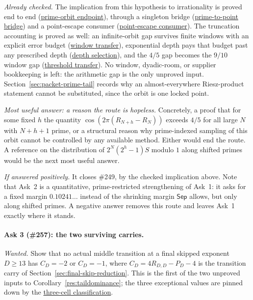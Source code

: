 \documentclass[11pt]{article}
\newcommand{\commit}{bb4e24651b37cd096d3749ef299c3317930b3a3b}
\newcommand{\repobase}{https://github.com/wcook04/plectis-lean-erdos249-257/blob/\commit}
\newcommand{\PK}{Erdos249257}
\newcommand{\lword}[4]{\href{\repobase/\PK/#1\#L#2}{#4}}
\theoremstyle{definition}
\theoremstyle{remark}
\begin{document}
\emph{Already checked.}  The implication from this hypothesis to
irrationality is proved end to end
(\lword{PivotAntiReconstruction.lean}{1574}{irrational_totient_series_of_naturalPrimeTailOrbitGap}{prime-orbit endpoint}),
through a singleton bridge
(\lword{PivotAntiReconstruction.lean}{1266}{naturalPivotPointEscape_of_naturalPrimeTailOrbitGap}{prime-to-point bridge})
and a point-escape consumer
(\lword{PivotAntiReconstruction.lean}{1550}{irrational_totient_series_of_naturalPivotPointEscape}{point-escape consumer}).
The truncation accounting is proved as well: an infinite-orbit gap survives
finite windows with an explicit error budget
(\lword{PivotAntiReconstruction.lean}{220}{windowFirstCos_le_add_of_tailOrbitGap}{window transfer}),
exponential depth pays that budget past any prescribed depth
(\lword{PivotAntiReconstruction.lean}{257}{exists_natural_window_depth_with_error}{depth selection}),
and the \(4/5\) gap becomes the \(9/10\) window gap
(\lword{PivotAntiReconstruction.lean}{233}{windowFirstCos_le_nine_tenths_of_tailOrbitGap}{threshold transfer}).
No window, dyadic-room, or supplier bookkeeping is left: the arithmetic gap
is the only unproved input.  Section~\ref{sec:packet-prime-tail} records why
an almost-everywhere Riesz-product statement cannot be substituted, since the
orbit is one locked point.

\emph{Most useful answer: a reason the route is hopeless.}  Concretely, a
proof that for some fixed \(h\) the quantity \(\cos(2\pi(R_{N+h}-R_N))\)
exceeds \(4/5\) for all large \(N\) with \(N+h+1\) prime, or a structural
reason why prime-indexed sampling of this orbit cannot be controlled by any
available method.  Either would end the route.  A reference on the
distribution of \(2^{N}(2^{h}-1)S\) modulo \(1\) along shifted primes would
be the next most useful answer.

\emph{If answered positively.}  It closes \#249, by the checked implication
above.  Note that Ask~2 is a quantitative, prime-restricted strengthening of
Ask~1: it asks for a fixed margin \(0.10241\ldots\) instead of the shrinking
margin \(\mathsf{Sep}\) allows, but only along shifted primes.  A negative
answer removes this route and leaves Ask~1 exactly where it stands.

\paragraph{Ask 3 (\#257): the two surviving carries.}
\emph{Wanted.}  Show that no actual middle transition at a final skipped
exponent \(D\ge13\) has \(C_D=-2\) or \(C_D=-1\), where
\(C_D=4R_{D,D}-P_D-4\) is the transition carry of
Section~\ref{sec:final-skip-reduction}.  This is the first of the two
unproved inputs to Corollary~\ref{res:taildominance}; the three exceptional
values are pinned down by the
\lword{HalfCylinderMiddleCarryLowerBound.lean}{4125}{seamMiddleCoordinate_not_safe_iff_three_cells}{three-cell classification}.
\end{document}
